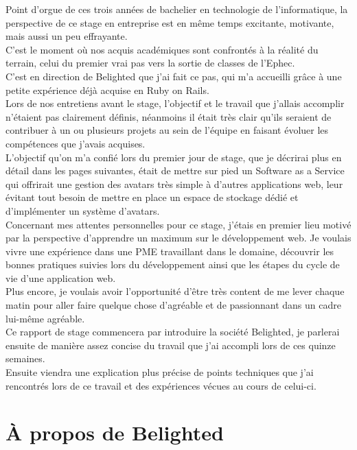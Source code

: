 \documentclass{report}
\begin{document}
  Point d'orgue de ces trois années de bachelier en technologie de l'informatique, la perspective de ce stage en entreprise
  est en même temps excitante, motivante, mais aussi un peu effrayante.\\
  C'est le moment où nos acquis académiques sont confrontés à la réalité du terrain, celui du premier vrai pas vers la sortie
  de classes de l'Ephec.\\

  C'est en direction de Belighted que j'ai fait ce pas, qui m'a accueilli grâce à une petite expérience déjà acquise en Ruby on Rails.\\
  Lors de nos entretiens avant le stage, l'objectif et le travail que j'allais accomplir n'étaient pas clairement définis, néanmoins il était
  très clair qu'ils seraient de contribuer à un ou plusieurs projets au sein de l'équipe en faisant évoluer les compétences que j'avais acquises.\\
  L'objectif qu'on m'a confié lors du premier jour de stage, que je décrirai plus en détail dans les pages suivantes, était de mettre sur pied un Software as a
  Service qui offrirait une gestion des avatars très simple
  à d'autres applications web, leur évitant tout besoin de mettre en place un espace de stockage dédié et d'implémenter un
  système d'avatars.\\

  Concernant mes attentes personnelles pour ce stage, j'étais en premier lieu motivé par la perspective d'apprendre un maximum
  sur le développement web. Je voulais vivre une expérience dans une PME travaillant dans le domaine, découvrir les bonnes
  pratiques suivies lors du développement ainsi que les étapes du cycle de vie d'une application web.\\
  Plus encore, je voulais avoir l'opportunité d'être très content de me lever chaque matin pour aller faire quelque chose d'agréable et de passionnant
  dans un cadre lui-même agréable.\\

  Ce rapport de stage commencera par introduire la société Belighted, je parlerai ensuite de manière assez concise du travail que j'ai accompli lors de ces quinze semaines.\\
  Ensuite viendra une explication plus précise de points techniques que j'ai rencontrés lors de ce travail et des expériences vécues au cours de celui-ci.\\


\chapter{À propos de Belighted}
\end{document}
